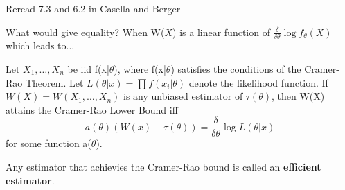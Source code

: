 \documentclass[11pt,fleqn]{book} %
\begin{document}
	\begin{remark}
		Reread 7.3 and 6.2 in Casella and Berger
	\end{remark}

	What would give equality? When W($\underline{X}$) is a linear function of $\frac{\delta}{\delta \theta} \log f_\theta(\underline{X})$ which leads to... 

	\begin{corollary}[Attainment]
		Let $X_1,\dots,X_n$ be iid f(x|$\theta$), where f(x|$\theta$) satisfies the conditions of the Cramer-Rao Theorem. Let $L(\theta|x) = \prod f(x_i|\theta)$ denote the likelihood function. If $W(X) = W(X_1,\dots,X_n)$ is any unbiased estimator of $\tau(\theta)$, then W(X) attains the Cramer-Rao Lower Bound iff
		$$ a(\theta)\left(W(x) - \tau(\theta)\right) = \frac{\delta}{\delta \theta} \log L(\theta|x) $$
		for some function a($\theta$).
	\end{corollary}

	\begin{definition}[Efficient]
		Any estimator that achievies the Cramer-Rao bound is called an \textbf{efficient estimator}.
	\end{definition}
\end{document}
